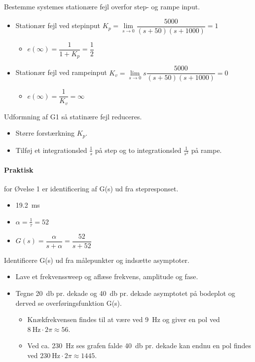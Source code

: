 \documentclass[danish]{article}
\begin{document}
Bestemme systemes stationære fejl overfor step- og rampe input. 
\begin{itemize}
	\item Stationær fejl ved stepinput $K_p = \lim\limits_{s\rightarrow 0} \dfrac{5000}{(s+50)(s+1000)}=1$
	\begin{itemize}
		\item $e(\infty)=\dfrac{1}{1+K_p} = \dfrac{1}{2}$
	\end{itemize}
	\item Stationær fejl ved rampeinput $K_v = \lim\limits_{s\rightarrow 0} s \dfrac{5000}{(s+50)(s+1000)}=0$
	\begin{itemize}
		\item $e(\infty)=\dfrac{1}{K_v} = \infty$
	\end{itemize}
\end{itemize}

Udformning af G1 så statinære fejl reduceres. 
\begin{itemize}
	\item Større forstærkning $K_p$.
	\item Tilføj et integrationsled $\frac{1}{s}$ på step og to integrationsled $\frac{1}{s^2}$ på rampe.
\end{itemize}

\paragraph{Praktisk} for Øvelse 1 er identificering af G(s) ud fra stepresponset.

\begin{itemize}
	\item \si{\tau} \SI{19,2}{\milli\second}
	\item $\alpha = \frac{1}{\tau} = 52$
	\item $G(s)= \dfrac{\alpha}{s+\alpha} = \dfrac{52}{s+52}$
\end{itemize}

Identificere G(s) ud fra målepunkter og indsætte asymptoter.
\begin{itemize}
	\item Lave et frekvenssweep og aflæse frekvens, amplitude og fase.
	\item Tegne \SI{20}{\decibel} pr. dekade og \SI{40}{\decibel} pr. dekade asymptotet på bodeplot og derved se overføringsfunktion G(s).
	\begin{itemize}
		\item Knækfrekvensen findes til at være ved \SI{9}{\hertz} og giver en pol ved $\SI{8}{\hertz}\cdot 2\pi \approx 56$.
		\item Ved ca. \SI{230}{\hertz} ses grafen falde \SI{40}{\decibel} pr. dekade kan endnu en pol findes ved $\SI{230}{\hertz}\cdot 2\pi \approx 1445$.
	\end{itemize}
\end{itemize}
\end{document}
